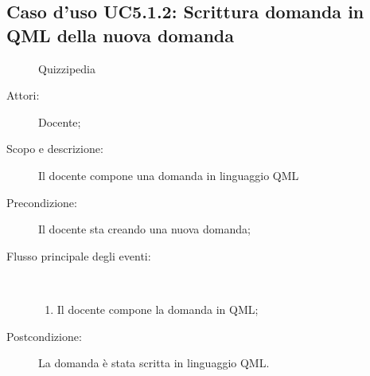 \subsection{Caso d'uso UC5.1.2: Scrittura domanda in QML della nuova domanda}
	\begin{figure}[H]
		\centering
		\begin{resizedtikzpicture}{\textwidth}
		\begin{umlsystem}[x=0, fill=lightgray!20]{Quizzipedia}
		\end{umlsystem}
		\end{resizedtikzpicture}
		\caption{}
	\end{figure}
\begin{description}
\item[Attori:] Docente;
\item[Scopo e descrizione:] Il docente compone una domanda in linguaggio QML
      \item[Precondizione:] Il docente sta creando una nuova domanda;

        \item[Flusso principale degli eventi:] \ 
 \begin{enumerate}
          \item Il docente compone la domanda in QML;

      \end{enumerate}
    \item[Postcondizione:] La domanda è stata scritta in linguaggio QML.
  \end{description}
\hypertarget{UC5.1.3}{}
